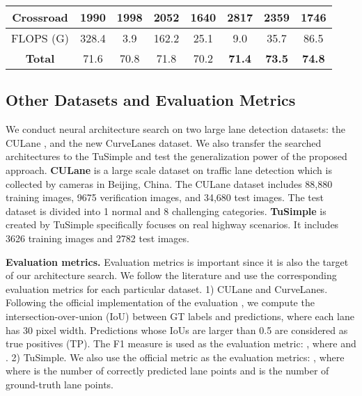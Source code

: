 \documentclass[runningheads]{llncs}
\providecommand{\tabularnewline}{\\}
\begin{document}
\begin{table}[tb]
\begin{centering}
\begin{tabular}{c|cccc|ccc}
{\scriptsize{}Crossroad} & {\scriptsize{}1990} & {\scriptsize{}1998} & {\scriptsize{}2052} & {\scriptsize{}1640} & {\scriptsize{}2817} & {\scriptsize{}2359} & {\scriptsize{}1746}\tabularnewline
\hline 
{\scriptsize{}FLOPS (G)} & {\scriptsize{}328.4} & {\scriptsize{}3.9} & {\scriptsize{}162.2} & {\scriptsize{}25.1} & {\scriptsize{}9.0} & {\scriptsize{}35.7} & {\scriptsize{}86.5}\tabularnewline
\hline 
\textbf{\scriptsize{}Total} & {\scriptsize{}71.6} & {\scriptsize{}70.8} & {\scriptsize{}71.8} & {\scriptsize{}70.2} & \textbf{\scriptsize{}71.4} & \textbf{\scriptsize{}73.5} & \textbf{\scriptsize{}74.8}\tabularnewline
\hline 
\end{tabular}{\scriptsize\par}
\par\end{centering}

\end{table}


\subsection{Other Datasets and Evaluation Metrics}

We conduct neural architecture search on two large lane detection
datasets: the CULane \cite{pan2018spatial}, and the new CurveLanes
dataset. We also transfer the searched architectures to the TuSimple
\cite{TuSimple} and test the generalization power of the proposed
approach.\textbf{ CULane} \cite{pan2018spatial} is a large scale
dataset on traffic lane detection which is collected by cameras in
Beijing, China. The CULane dataset includes 88,880 training images,
9675 verification images, and 34,680 test images. The test dataset
is divided into 1 normal and 8 challenging categories.\textbf{ TuSimple
}\cite{TuSimple} is created by TuSimple specifically focuses on real
highway scenarios. It includes 3626 training images and 2782 test
images. 

\textbf{Evaluation metrics.} Evaluation metrics is important since
it is also the target of our architecture search. We follow the literature
\cite{pan2018spatial} and use the corresponding evaluation metrics
for each particular dataset. 1) CULane and CurveLanes. Following the
official implementation of the evaluation \cite{pan2018spatial},
we compute the intersection-over-union (IoU) between GT labels and
predictions, where each lane has 30 pixel width. Predictions whose
IoUs are larger than 0.5 are considered as true positives (TP). The
F1 measure is used as the evaluation metric: ,
where  and .
2) TuSimple. We also use the official metric as the evaluation metrics:
, where where  is the
number of correctly predicted lane points and  is the number
of ground-truth lane points.
\end{document}
